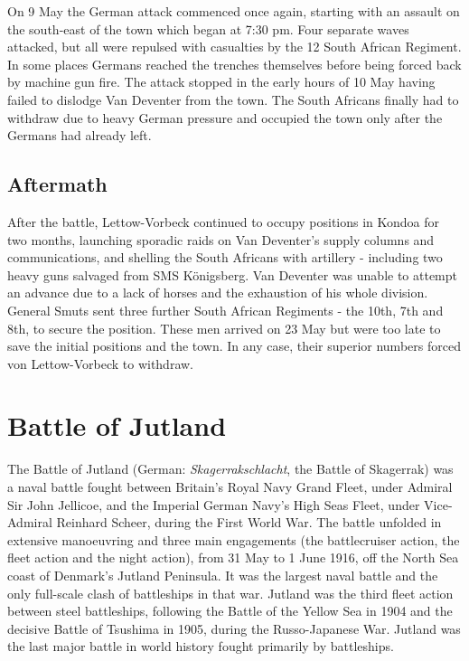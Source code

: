 \documentclass[a4paper,]{book}
\begin{document}
On 9 May the German attack commenced once again, starting with an assault on the south-east of the town which began at 7:30 pm. Four separate waves attacked, but all were repulsed with casualties by the 12 South African Regiment. In some places Germans reached the trenches themselves before being forced back by machine gun fire. The attack stopped in the early hours of 10 May having failed to dislodge Van Deventer from the town. The South Africans finally had to withdraw due to heavy German pressure and occupied the town only after the Germans had already left. 

\subsection{Aftermath}

After the battle, Lettow-Vorbeck continued to occupy positions in Kondoa for two months, launching sporadic raids on Van Deventer's supply columns and communications, and shelling the South Africans with artillery - including two heavy guns salvaged from SMS Königsberg. Van Deventer was unable to attempt an advance due to a lack of horses and the exhaustion of his whole division. General Smuts sent three further South African Regiments - the 10th, 7th and 8th, to secure the position. These men arrived on 23 May but were too late to save the initial positions and the town. In any case, their superior numbers forced von Lettow-Vorbeck to withdraw.


\section{Battle of Jutland}

The Battle of Jutland (German: \textit{Skagerrakschlacht}, the Battle of Skagerrak) was a naval battle fought between Britain's Royal Navy Grand Fleet, under Admiral Sir John Jellicoe, and the Imperial German Navy's High Seas Fleet, under Vice-Admiral Reinhard Scheer, during the First World War. The battle unfolded in extensive manoeuvring and three main engagements (the battlecruiser action, the fleet action and the night action), from 31 May to 1 June 1916, off the North Sea coast of Denmark's Jutland Peninsula. It was the largest naval battle and the only full-scale clash of battleships in that war. Jutland was the third fleet action between steel battleships, following the Battle of the Yellow Sea in 1904 and the decisive Battle of Tsushima in 1905, during the Russo-Japanese War. Jutland was the last major battle in world history fought primarily by battleships.
\end{document}

